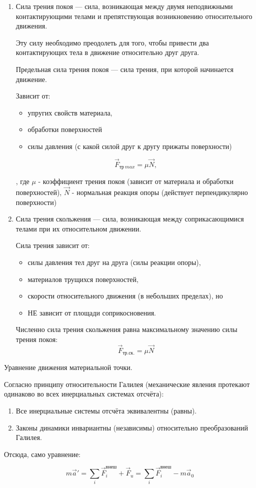 \begin{enumerate}
    \item Сила трения покоя — сила, возникающая между двумя неподвижными контактирующими телами и препятствующая возникновению относительного движения.
    
    Эту силу необходимо преодолеть для того, чтобы привести два контактирующих тела в движение относительно друг друга.
    
    Предельная сила трения покоя — сила трения, при которой начинается движение.
    
    Зависит от:
    \begin{itemize}
        \item упругих свойств материала,
        \item обработки поверхностей
        \item силы давления (с какой силой друг к другу прижаты поверхности)
    \end{itemize}
        
        $$\vec F_{тр\ max}=\mu \vec N,$$

        , где $\mu$ - коэффициент трения покоя (зависит от материала и обработки поверхностей),
        $\vec N$ - нормальная реакция опоры (действует перпендикулярно поверхности)

    \item Сила трения скольжения — сила, возникающая между соприкасающимися телами при их относительном движении.
    
    Сила трения зависит от:
    \begin{itemize}
        \item силы давления тел друг на друга (силы реакции опоры),
        \item материалов трущихся поверхностей,
        \item скорости относительного движения (в небольших пределах), но
        \item НЕ зависит от площади соприкосновения.
    \end{itemize}

    Численно сила трения скольжения равна максимальному значению силы трения покоя:
    $$\vec F_{тр.ск.}=\mu\vec N$$
\end{enumerate}

\begin{definition}
    Уравнение движения материальной точки.

    Согласно принципу относительности Галилея (механические явления протекают одинаково во всех инерциальных системах отсчёта):
    \begin{enumerate}
        \item Все инерциальные системы отсчёта эквивалентны (равны).
        \item Законы динамики инвариантны (независимы) относительно преобразований Галилея.
    \end{enumerate}

Отсюда, само уравнение:

$$m\vec a'=\sum_i\vec F_i^{внеш}+\vec F_u=\sum_i\vec F_i^{внеш}-m\vec a_0$$
\end{definition}

